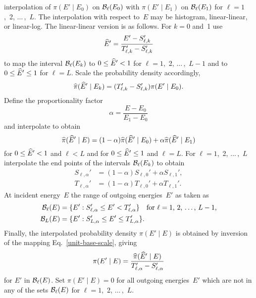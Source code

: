\begin{enumerate}
interpolation of $\pi( E' \mid E_0 )$ on ${\cal B}_\ell(E_0)$ with
$\pi( E' \mid E_1 )$ on ${\cal B}_\ell(E_1)$
for $\ell = 1$,~2, $\ldots\,$,~$L$. The interpolation with
respect to~$E$ may be histogram, linear-linear, or linear-log.
The linear-linear version is as follows.  
For $k = 0$ and~1 use
\begin{equation}
  \widehat E' = \frac{ E' -  S_{\ell,k}'}{  T_{\ell,k}' -  S_{\ell,k}'}
  \label{unit-base-map-cum}
\end{equation}
to map the interval ${\cal B}_\ell(E_k)$
to $0 \le \widehat E' < 1$ for $\ell = 1$,~2, $\ldots\,$,~$L-1$ and to
$0 \le \widehat E' \le 1$ for $\ell = L$.  Scale the probability density
accordingly,
\begin{equation}
  \widehat \pi(\widehat E' \mid E_k) = (T_{\ell,k}' -S_{\ell,k}' )\pi(E' \mid E_0).
  \label{unit-base-scale}
\end{equation}
Define the proportionality factor
\begin{equation}
  \alpha = \frac{ E - E_0 }{ E_1 - E_0 }
  \label{def-alpha-cum}
\end{equation}
and interpolate to obtain
\begin{equation}
  \widehat \pi(\widehat E' \mid E) = (1 - \alpha)\widehat \pi(\widehat E' \mid E_0) +
   \alpha \widehat \pi(\widehat E' \mid E_1)
 \label{unitbaseInterpCum}
\end{equation}
for $0 \le \widehat E' < 1$ and $\ell < L$ and for $0 \le \widehat E' \le 1$ and $\ell = L$.
For $\ell = 1$,~2, $\ldots\,$,~$L$
interpolate the end points of the intervals ${\cal B}_\ell(E_k)$ to
obtain
\begin{equation}
 \begin{split}
  S_{\ell,\alpha}' &= (1 - \alpha)S_{\ell,0}' + \alpha S_{\ell,1}', \\
  T_{\ell,\alpha}' &= (1 - \alpha)T_{\ell,0}' + \alpha T_{\ell,1}'.
 \end{split}
  \label{energy-range}
\end{equation}
At incident energy~$E$ 
the range of outgoing energies~$E'$ as taken as
\begin{equation}
 \begin{split}
   {\cal B}_\ell(E) &= \{E' : S_{\ell,\alpha}' \le E' < T_{\ell,\alpha}' \}
     \quad \text{for $\ell = 1$,~2, $\ldots\,$,~$L-1$,} \\
   {\cal B}_L(E) &= \{E' : S_{L,\alpha}' \le E' \le T_{L,\alpha}' \}.
 \end{split}
  \label{def-B-ell-alpha}
\end{equation}
Finally, the interpolated probability
density $\pi( E' \mid E )$ is obtained by inversion of the mapping
Eq.~\eqref{unit-base-scale}, giving
\begin{equation}
  \pi(E' \mid E) = \frac{\widehat \pi(\widehat E' \mid E)}{  T_{\ell,\alpha}' -  S_{\ell,\alpha}'}
 \label{map-inv}
\end{equation}
for $E'$ in ${\cal B}_\ell(E)$.
Set $\pi(E' \mid E) = 0$ for all outgoing energies~$E'$ which 
are not in any of the sets ${\cal B}_\ell(E)$ for 
$\ell = 1$,~2, $\ldots\,$,~$L$.
\end{enumerate}

